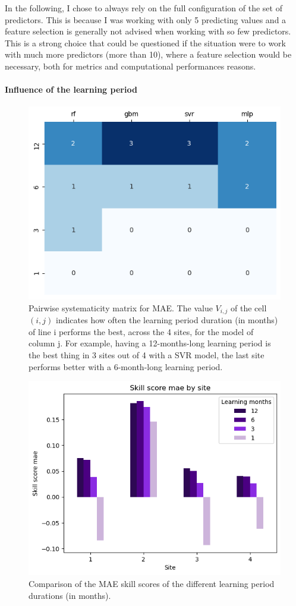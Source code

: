 In the following, I chose to always rely on the full configuration of the set of predictors. This is because I was working with only 5 predicting values and a feature selection is generally not advised when working with so few predictors.
This is a strong choice that could be questioned if the situation were to work with much more predictors (more than 10), where a feature selection would be necessary, both for metrics and computational performances reasons.
\paragraph{Influence of the learning period}
\indent
\begin{figure}[htb!]
    \centering
    \includegraphics[width=0.7\columnwidth]{figures/first_study/comp_learning_period_mae.png}
\caption{Pairwise systematicity matrix for MAE. The value $V_{i,j}$ of the cell $(i,j)$ indicates how often the learning period duration (in months) of line i performs the best, across the 4 sites, for the model of column j. For example, having a 12-months-long learning period is the best thing in 3 sites out of 4 with a SVR model, the last site performs better with a 6-month-long learning period.}
\label{fig:matrix_period}
\end{figure}

\newpage
\begin{figure}[htb!]
    \centering
    \includegraphics[width=0.70\columnwidth]{figures/first_study/comp_learning_period_mae_svr.png}
\caption{Comparison of the MAE skill scores of the different learning period durations (in months).}
    \label{fig:ss_period}
\end{figure}

